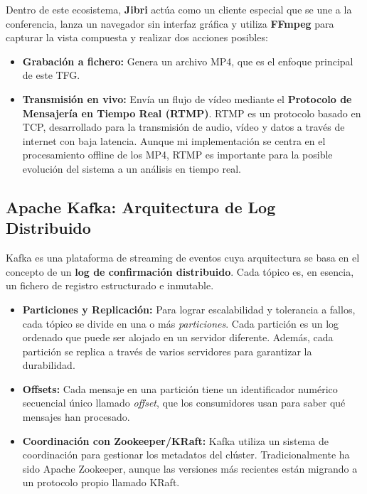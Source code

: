 Dentro de este ecosistema, \textbf{Jibri} actúa como un cliente especial que se une a la conferencia, lanza un navegador sin interfaz gráfica y utiliza \textbf{FFmpeg} para capturar la vista compuesta y realizar dos acciones posibles:
\begin{itemize}
    \item \textbf{Grabación a fichero:} Genera un archivo MP4, que es el enfoque principal de este TFG.
    \item \textbf{Transmisión en vivo:} Envía un flujo de vídeo mediante el \textbf{Protocolo de Mensajería en Tiempo Real (RTMP)}. RTMP es un protocolo basado en TCP, desarrollado para la transmisión de audio, vídeo y datos a través de internet con baja latencia. Aunque mi implementación se centra en el procesamiento offline de los MP4, RTMP es importante para la posible evolución del sistema a un análisis en tiempo real.
\end{itemize}

\subsection{Apache Kafka: Arquitectura de Log Distribuido}
Kafka \cite{KafkaWebDoc} es una plataforma de streaming de eventos cuya arquitectura se basa en el concepto de un \textbf{log de confirmación distribuido}. Cada tópico es, en esencia, un fichero de registro estructurado e inmutable.
\begin{itemize}
    \item \textbf{Particiones y Replicación:} Para lograr escalabilidad y tolerancia a fallos, cada tópico se divide en una o más \textit{particiones}. Cada partición es un log ordenado que puede ser alojado en un servidor diferente. Además, cada partición se replica a través de varios servidores para garantizar la durabilidad.
    \item \textbf{Offsets:} Cada mensaje en una partición tiene un identificador numérico secuencial único llamado \textit{offset}, que los consumidores usan para saber qué mensajes han procesado.
    \item \textbf{Coordinación con Zookeeper/KRaft:} Kafka utiliza un sistema de coordinación para gestionar los metadatos del clúster. Tradicionalmente ha sido Apache Zookeeper, aunque las versiones más recientes están migrando a un protocolo propio llamado KRaft.
\end{itemize}

